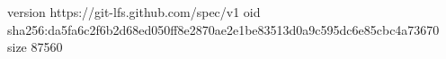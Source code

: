 version https://git-lfs.github.com/spec/v1
oid sha256:da5fa6c2f6b2d68ed050ff8e2870ae2e1be83513d0a9c595dc6e85cbc4a73670
size 87560
